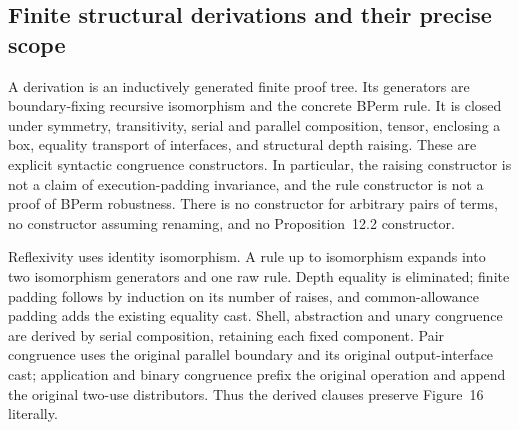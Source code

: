 




\subsection{Finite structural derivations and their precise scope}

A derivation is an inductively generated finite proof tree. Its generators are
boundary-fixing recursive isomorphism and the concrete BPerm rule. It is closed
under symmetry, transitivity, serial and parallel composition, tensor, enclosing
a box, equality transport of interfaces, and structural depth raising. These are
explicit syntactic congruence constructors. In particular, the raising constructor
is not a claim of execution-padding invariance, and the rule constructor is not
a proof of BPerm robustness. There is no constructor for arbitrary pairs of terms,
no constructor assuming renaming, and no Proposition~12.2 constructor.


Reflexivity uses identity isomorphism. A rule up to isomorphism expands
into two isomorphism generators and one raw rule. Depth equality is eliminated;
finite padding follows by induction on its number of raises, and common-allowance
padding adds the existing equality cast. Shell, abstraction and unary congruence
are derived by serial composition, retaining each fixed component. Pair congruence
uses the original parallel boundary and its original output-interface cast;
application and binary congruence prefix the original operation and append the
original two-use distributors. Thus the derived clauses preserve Figure~16
literally.




